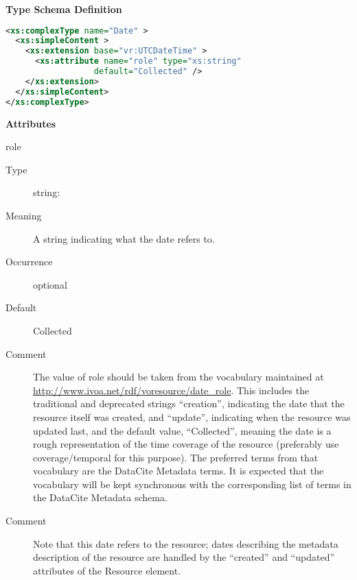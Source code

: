 \documentclass[11pt,a4paper]{ivoa}
\begin{document}
\begin{generated}
\begingroup
        \renewcommand*\descriptionlabel[1]{%
        \hbox to 5.5em{\emph{#1}\hfil}}\vspace{1ex}\noindent\textbf{ Type Schema Definition}

\begin{lstlisting}[language=XML,basicstyle=\footnotesize]
<xs:complexType name="Date" >
  <xs:simpleContent >
    <xs:extension base="vr:UTCDateTime" >
      <xs:attribute name="role" type="xs:string"
                  default="Collected" />
    </xs:extension>
  </xs:simpleContent>
</xs:complexType>
\end{lstlisting}

\vspace{0.5ex}\noindent\textbf{ Attributes}

\begingroup\small\begin{bigdescription}
\item[role]
\begin{description}
\item[Type] string: 
\item[Meaning]
                 A string indicating what the date refers to.

\item[Occurrence] optional
\item[Default] Collected
\item[Comment]
               	The value of role should be taken from the vocabulary
               	maintained at
               	\url{http://www.ivoa.net/rdf/voresource/date_role}.
               	This includes the traditional and deprecated strings
                “creation”, indicating the date that the resource
                itself was created, and “update”, indicating when the
                resource was updated last, and the default value,
                “Collected”, meaning the date is a rough
                representation of the time coverage of the resource
                (preferably use coverage/temporal for this purpose).
                The preferred terms from that vocabulary are the DataCite
                Metadata terms.   It is expected that the vocabulary will
                be kept synchronous with the corresponding list of terms
                in the DataCite Metadata schema.

\item[Comment]
                 Note that this date refers to the resource; dates describing
                 the metadata description of the resource are handled by
                 the “created” and “updated” attributes of the Resource
                 element.

\end{description}


\end{bigdescription}\endgroup

\endgroup
\end{generated}
\end{document}
